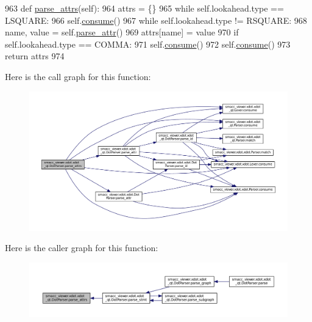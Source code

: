 \begin{DoxyCode}
963     \textcolor{keyword}{def }\hyperlink{classsmacc__viewer_1_1xdot_1_1xdot__qt_1_1DotParser_af1efca86cd85a355e09fa7456b25c139}{parse\_attrs}(self):
964         attrs = \{\}
965         \textcolor{keywordflow}{while} self.lookahead.type == LSQUARE:
966             self.\hyperlink{classsmacc__viewer_1_1xdot_1_1xdot__qt_1_1Parser_aba6f69f48f1d4e25b13e4cb297f509e6}{consume}()
967             \textcolor{keywordflow}{while} self.lookahead.type != RSQUARE:
968                 name, value = self.\hyperlink{classsmacc__viewer_1_1xdot_1_1xdot__qt_1_1DotParser_ab3eea2cffc30fd68114edb0e8960d4a6}{parse\_attr}()
969                 attrs[name] = value
970                 \textcolor{keywordflow}{if} self.lookahead.type == COMMA:
971                     self.\hyperlink{classsmacc__viewer_1_1xdot_1_1xdot__qt_1_1Parser_aba6f69f48f1d4e25b13e4cb297f509e6}{consume}()
972             self.\hyperlink{classsmacc__viewer_1_1xdot_1_1xdot__qt_1_1Parser_aba6f69f48f1d4e25b13e4cb297f509e6}{consume}()
973         \textcolor{keywordflow}{return} attrs
974 
\end{DoxyCode}


Here is the call graph for this function\+:
\nopagebreak
\begin{figure}[H]
\begin{center}
\leavevmode
\includegraphics[width=350pt]{classsmacc__viewer_1_1xdot_1_1xdot__qt_1_1DotParser_af1efca86cd85a355e09fa7456b25c139_cgraph}
\end{center}
\end{figure}




Here is the caller graph for this function\+:
\nopagebreak
\begin{figure}[H]
\begin{center}
\leavevmode
\includegraphics[width=350pt]{classsmacc__viewer_1_1xdot_1_1xdot__qt_1_1DotParser_af1efca86cd85a355e09fa7456b25c139_icgraph}
\end{center}
\end{figure}


